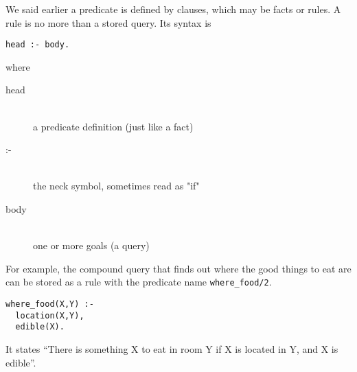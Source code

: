 \label{adv5}\secdown

We said earlier a predicate is defined by clauses, which may be facts or rules. A rule is no more than a stored query. Its syntax is
\begin{verbatim}
head :- body.
\end{verbatim}
where
\begin{description}
\item[head]\ \\
a predicate definition (just like a fact)
\item[:-]\ \\
the neck symbol, sometimes read as "if"
\item[body]\ \\
one or more goals (a query)
\end{description}

For example, the compound query that finds out where the good things to eat are
can be stored as a rule with the predicate name \verb'where_food/2'.
\begin{verbatim}
where_food(X,Y) :-  
  location(X,Y),
  edible(X).
\end{verbatim}
It states ``There is something X to eat in room Y if X is located in Y, and X
is edible''.

\secup